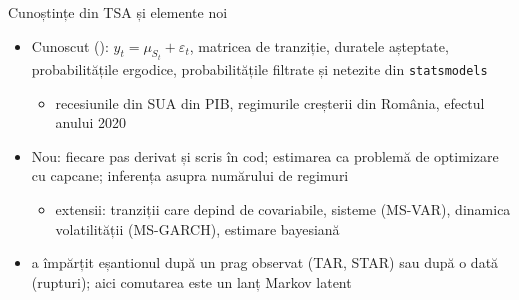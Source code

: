 \begin{frame}{Cunoștințe din TSA și elemente noi}
\itemsize{\small}
\begin{itemize}
    \item Cunoscut (): $y_t = \mu_{S_t} + \varepsilon_t$, matricea de tranziție, duratele așteptate, probabilitățile ergodice, probabilitățile filtrate și netezite din \texttt{statsmodels}
    \begin{itemize}
        \item recesiunile din SUA din PIB, regimurile creșterii din România, efectul anului 2020
    \end{itemize}
    \item Nou: fiecare pas derivat și scris în cod; estimarea ca problemă de optimizare cu capcane; inferența asupra numărului de regimuri
    \begin{itemize}
        \item extensii: tranziții care depind de covariabile, sisteme (MS-VAR), dinamica volatilității (MS-GARCH), estimare bayesiană
    \end{itemize}
    \item {} a împărțit eșantionul după un prag observat (TAR, STAR) sau după o dată (rupturi); aici comutarea este un lanț Markov latent
\end{itemize}
\end{frame}

